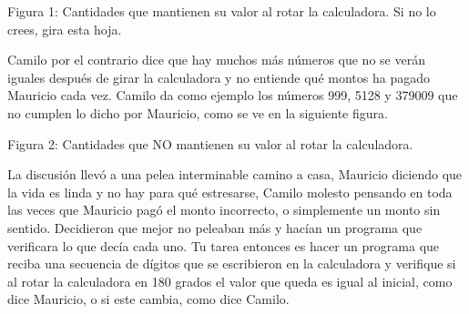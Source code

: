\documentclass{oci}
\begin{document}
\begin{problemDescription}
\begin{center}
{Figura 1: Cantidades que mantienen su valor al rotar la calculadora. Si no lo crees, gira esta hoja.}
\end{center}

\bigskip
\bigskip


Camilo por el contrario dice que hay muchos más números que no se verán iguales después de girar la calculadora
y no entiende qué montos ha pagado Mauricio cada vez.
Camilo da como ejemplo los números 999, 5128 y 379009 que no cumplen lo dicho por Mauricio, como se ve en la siguiente figura.

\bigskip
\bigskip

\begin{center}
\resizebox{!}{40pt}{} \hspace*{50pt}  
\resizebox{!}{40pt}{} \hspace*{50pt}  
\resizebox{!}{40pt}{}\bigskip

{Figura 2: Cantidades que NO mantienen su valor al rotar la calculadora.}
\end{center}

\bigskip
\bigskip


La discusión llevó a una pelea interminable camino a casa, Mauricio diciendo que la vida es linda y no hay para qué estresarse, 
Camilo molesto pensando en toda las veces que Mauricio pagó el monto incorrecto, o simplemente un monto sin sentido. 
Decidieron que mejor no peleaban más y hacían un programa que verificara lo que decía cada uno.
Tu tarea entonces es hacer un programa que reciba una secuencia de dígitos que se escribieron en la calculadora y 
verifique si al rotar la calculadora en 180 grados el valor que queda es igual al inicial, como dice Mauricio, o si 
este cambia, como dice Camilo.

  
%

%
%

\end{problemDescription}
\end{document}
